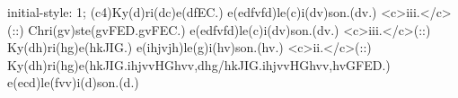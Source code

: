 initial-style: 1;
(c4)Ky(d)ri(dc)e(dfEC.) e(edfvfd)le(c)i(dv)son.(dv.) <c>iii.</c>(::)
Chri(gv)ste(gvFED.gvFEC.) e(edfvfd)le(c)i(dv)son.(dv.) <c>iii.</c>(::)
Ky(dh)ri(hg)e(hkJIG.) e(ihjvjh)le(g)i(hv)son.(hv.) <c>ii.</c>(::) Ky(dh)ri(hg)e(hkJIG.ihjvvHGhvv,dhg/hkJIG.ihjvvHGhvv,hvGFED.) e(ecd)le(fvv)i(d)son.(d.)
